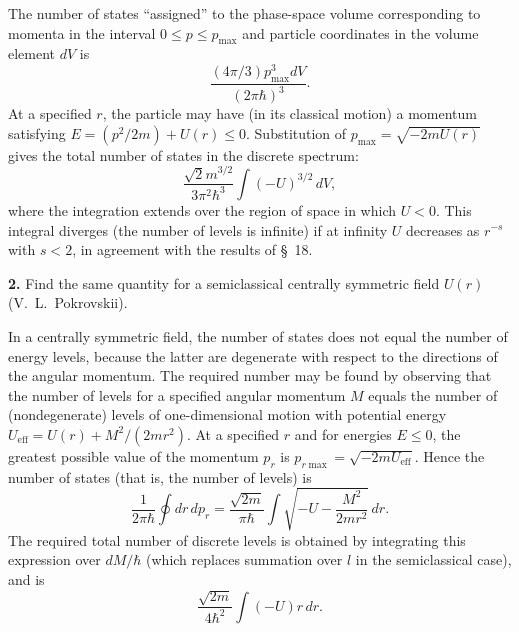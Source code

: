 \SolutionHeading The number of states ``assigned'' to the phase-space volume
corresponding to momenta in the interval $0\leq p\leq p_{\max}$ and particle
coordinates in the volume element $dV$ is
\[
  \frac{(4\pi/3)p_{\max}^3dV}{(2\pi\hbar)^3}.
\]
At a specified $r$, the particle may have (in its classical motion) a momentum
satisfying $E=(p^2/2m)+U(r)\leq0$. Substitution of
$p_{\max}=\sqrt{-2mU(r)}$ gives the total number of states in the discrete
spectrum:
\[
  \frac{\sqrt2m^{3/2}}{3\pi^2\hbar^3}\int(-U)^{3/2}\,dV,
\]
where the integration extends over the region of space in which $U<0$. This
integral diverges (the number of levels is infinite) if at infinity $U$
decreases as $r^{-s}$ with $s<2$, in agreement with the results of §~18.

\textbf{2.} Find the same quantity for a semiclassical centrally symmetric
field $U(r)$ (V.~L.~Pokrovskii).

\SolutionHeading In a centrally symmetric field, the number of states does
not equal the number of energy levels, because the latter are degenerate with
respect to the directions of the angular momentum. The required number may be
found by observing that the number of levels for a specified angular momentum
$M$ equals the number of (nondegenerate) levels of one-dimensional motion with
potential energy $U_{\text{eff}}=U(r)+M^2/(2mr^2)$. At a specified $r$ and for
energies $E\leq0$, the greatest possible value of the momentum $p_r$ is
$p_{r\max}=\sqrt{-2mU_{\text{eff}}}$. Hence the number of states (that is, the
number of levels) is
\[
  \frac1{2\pi\hbar}\oint dr\,dp_r
  =\frac{\sqrt{2m}}{\pi\hbar}\int
  \sqrt{-U-\frac{M^2}{2mr^2}}\,dr.
\]
The required total number of discrete levels is obtained by integrating this
expression over $dM/\hbar$ (which replaces summation over $l$ in the
semiclassical case), and is
\[
  \frac{\sqrt{2m}}{4\hbar^2}\int(-U)r\,dr.
\]
